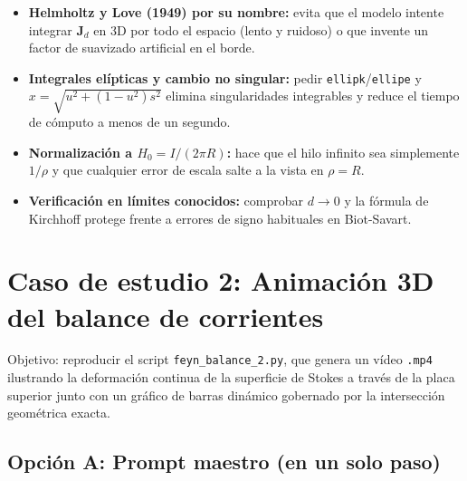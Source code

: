 \documentclass[11pt]{article}
\begin{document}
\begin{itemize}
    \item \textbf{Helmholtz y Love (1949) por su nombre:} evita que el modelo intente integrar $\mathbf{J}_d$ en 3D por todo el espacio (lento y ruidoso) o que invente un factor de suavizado artificial en el borde.
    \item \textbf{Integrales elípticas y cambio no singular:} pedir \texttt{ellipk}/\texttt{ellipe} y $x = \sqrt{u^2 + (1-u^2)s^2}$ elimina singularidades integrables y reduce el tiempo de cómputo a menos de un segundo.
    \item \textbf{Normalización a $H_0 = I/(2\pi R)$:} hace que el hilo infinito sea simplemente $1/\rho$ y que cualquier error de escala salte a la vista en $\rho = R$.
    \item \textbf{Verificación en límites conocidos:} comprobar $d \to 0$ y la fórmula de Kirchhoff protege frente a errores de signo habituales en Biot-Savart.
\end{itemize}

\section{Caso de estudio 2: Animación 3D del balance de corrientes}

Objetivo: reproducir el script \texttt{feyn\_balance\_2.py}, que genera un vídeo \texttt{.mp4} ilustrando la deformación continua de la superficie de Stokes a través de la placa superior junto con un gráfico de barras dinámico gobernado por la intersección geométrica exacta.

\subsection{Opción A: Prompt maestro (en un solo paso)}
\end{document}
